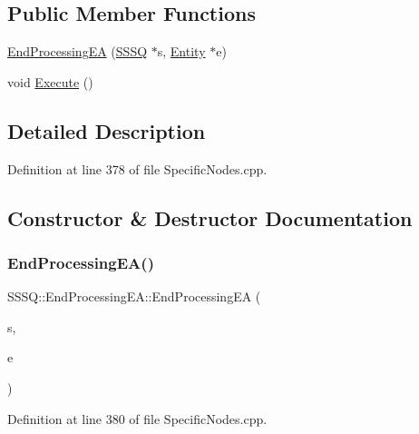 \subsection*{Public Member Functions}
\begin{DoxyCompactItemize}
\item 
\hyperlink{class_s_s_s_q_1_1_end_processing_e_a_a0346a53be04c74fc6c6909693ffe94d3}{End\+Processing\+EA} (\hyperlink{class_s_s_s_q}{S\+S\+SQ} $\ast$s, \hyperlink{class_entity}{Entity} $\ast$e)
\item 
void \hyperlink{class_s_s_s_q_1_1_end_processing_e_a_a58123dc9ac0660bd1da11407e5467968}{Execute} ()
\end{DoxyCompactItemize}


\subsection{Detailed Description}


Definition at line 378 of file Specific\+Nodes.\+cpp.



\subsection{Constructor \& Destructor Documentation}
\mbox{\label{class_s_s_s_q_1_1_end_processing_e_a_a0346a53be04c74fc6c6909693ffe94d3}} 
\subsubsection{\texorpdfstring{End\+Processing\+E\+A()}{EndProcessingEA()}}
{\footnotesize\ttfamily S\+S\+S\+Q\+::\+End\+Processing\+E\+A\+::\+End\+Processing\+EA (\begin{DoxyParamCaption}\item[{\hyperlink{class_s_s_s_q}{S\+S\+SQ} $\ast$}]{s,  }\item[{\hyperlink{class_entity}{Entity} $\ast$}]{e }\end{DoxyParamCaption})\hspace{0.3cm}{\ttfamily [inline]}}



Definition at line 380 of file Specific\+Nodes.\+cpp.



